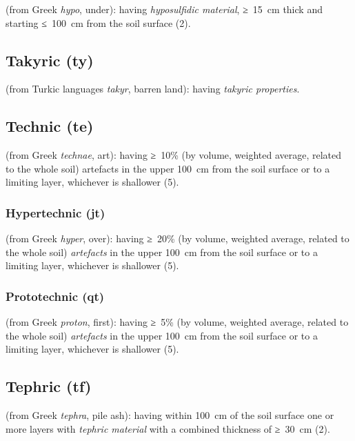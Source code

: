 \documentclass[
  letterpaper,
  DIV=11,
  numbers=noendperiod]{scrreprt}
\begin{document}
(from Greek \emph{hypo}, under): having \emph{hyposulfidic material},
≥~15~cm thick and starting ≤~100~cm from the soil surface (2).

\hypertarget{takyric-ty}{%
\subsection{Takyric (ty)}\label{takyric-ty}}

(from Turkic languages \emph{takyr}, barren land): having \emph{takyric
properties}.

\hypertarget{technic-te}{%
\subsection{Technic (te)}\label{technic-te}}

(from Greek \emph{technae}, art): having ≥~10\% (by volume, weighted
average, related to the whole soil) artefacts in the upper 100~cm from
the soil surface or to a limiting layer, whichever is shallower (5).

\hypertarget{hypertechnic-jt}{%
\subsubsection{Hypertechnic (jt)}\label{hypertechnic-jt}}

(from Greek \emph{hyper}, over): having ≥~20\% (by volume, weighted
average, related to the whole soil) \emph{artefacts} in the upper 100~cm
from the soil surface or to a limiting layer, whichever is shallower
(5).

\hypertarget{prototechnic-qt}{%
\subsubsection{Prototechnic (qt)}\label{prototechnic-qt}}

(from Greek \emph{proton}, first): having ≥~5\% (by volume, weighted
average, related to the whole soil) \emph{artefacts} in the upper 100~cm
from the soil surface or to a limiting layer, whichever is shallower
(5).

\hypertarget{tephric-tf}{%
\subsection{Tephric (tf)}\label{tephric-tf}}

(from Greek \emph{tephra}, pile ash): having within 100~cm of the soil
surface one or more layers with \emph{tephric material} with a combined
thickness of ≥~30~cm (2).
\end{document}
